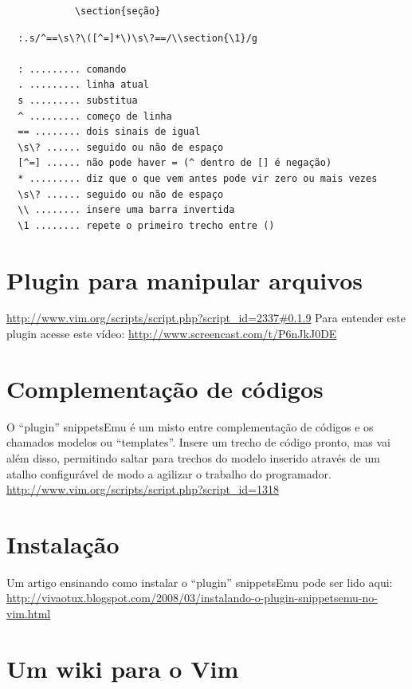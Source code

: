 \documentclass[10pt,a4paper,openany]{book}
\begin{document}
\begin{verbatim}
			\section{seção}
\end{verbatim}

\begin{verbatim}
  :.s/^==\s\?\([^=]*\)\s\?==/\\section{\1}/g

  : ......... comando
  . ......... linha atual
  s ......... substitua
  ^ ......... começo de linha
  == ........ dois sinais de igual
  \s\? ...... seguido ou não de espaço
  [^=] ...... não pode haver = (^ dentro de [] é negação)
  * ......... diz que o que vem antes pode vir zero ou mais vezes
  \s\? ...... seguido ou não de espaço
  \\ ........ insere uma barra invertida
  \1 ........ repete o primeiro trecho entre ()
\end{verbatim}

\section{Plugin para manipular arquivos}
\url{http://www.vim.org/scripts/script.php?script_id=2337#0.1.9}
Para entender este plugin acesse este vídeo:
 \url{http://www.screencast.com/t/P6nJkJ0DE}


\section{Complementação de códigos}
\label{Complementação de códigos}

O ``plugin'' snippetsEmu é um misto entre complementação de códigos e
os chamados modelos ou ``templates''. Insere um trecho de código pronto,
mas vai além disso, permitindo saltar para trechos do modelo inserido
através de um atalho configurável de modo a agilizar o trabalho do
programador. \url{http://www.vim.org/scripts/script.php?script\_id=1318}

\section{Instalação}
\label{Instalação}

Um artigo ensinando como instalar o ``plugin'' snippetsEmu pode ser lido aqui:
 \url{http://vivaotux.blogspot.com/2008/03/instalando-o-plugin-snippetsemu-no-vim.html}

\section{Um wiki para o Vim}
\label{Um wiki para o Vim}
\end{document}
